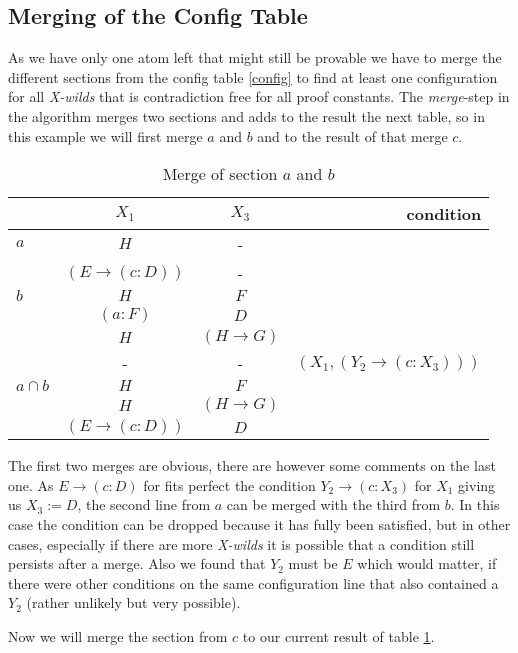 \subsection{Merging of the Config Table}

As we have only one atom left that might still be provable we have to merge the different sections from the config table \ref{config} to find at least one configuration for all \emph{X-wilds} that is contradiction free for all proof constants. The \emph{merge}-step in the algorithm merges two sections and adds to the result the next table, so in this example we will first merge $a$ and $b$ and to the result of that merge $c$.

\begin{table}[H]
\centering
\begin{tabular}{l c c r}
		& $X_1$ & $X_3$ & condition \\
	\hline 
	$a$	& $H$ & - &  \\
		& $(E \rightarrow (c:D))$ & - & \\
	\hline
	$b$ & $H$ & $F$ & \\
		& $(a:F)$ & $D$ & \\
		& $H$ & $(H \rightarrow G)$ & \\
		& - & - & $(X_1, (Y_2 \rightarrow (c:X_3)))$\\
	\hline
	\hline
	$a \cap b$	& $H$ & $F$ & \\
		& $H$ & $(H \rightarrow G)$ & \\
		& $(E \rightarrow (c:D))$ & $D$ & \\
	\hline
\end{tabular}
\caption{Merge of section $a$ and $b$}\label{merge_a_b}
\end{table}

The first two merges are obvious, there are however some comments on the last one. As $E \rightarrow (c:D)$ for fits perfect the condition $Y_2 \rightarrow (c:X_3)$ for $X_1$ giving us $X_3 := D$, the second line from $a$ can be merged with the third from $b$. In this case the condition can be dropped because it has fully been satisfied, but in other cases, especially if there are more \emph{X-wilds} it is possible that a condition still persists after a merge. Also we found that $Y_2$ must be $E$ which would matter, if there were other conditions on the same configuration line that also contained a $Y_2$ (rather unlikely but very possible).

Now we will merge the section from $c$ to our current result of table \ref{merge_a_b}.

